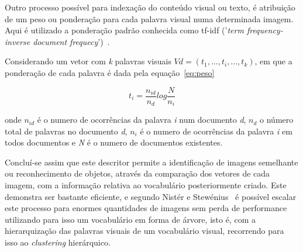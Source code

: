 Outro processo possível para indexação do conteúdo visual ou texto, é atribuição de um peso ou ponderação para cada palavra visual numa determinada imagem. Aqui é utilizado a ponderação padrão conhecida como tf-idf ('\textit{term frequency-inverse document frequecy}')~\cite{Sivic2003}. 

Considerando um vetor com \textit{k} palavras visuais $Vd = (t_{1},...,t_{i},...,t_{k})$, em que a ponderação de cada palavra é dada pela equação~\ref{eq:peso}

\begin{equation}
t_{i} = \frac{n_{id}}{n_{d}}log\frac{N}{n_{i}}
\label{eq:peso}
\end{equation}

onde $n_{id}$ é o numero de ocorrências da palavra \textit{i} num documento \textit{d}, $n_{d}$ o número total de palavras no documento \textit{d}, $n_{i}$ é o numero de ocorrências da palavra \textit{i} em todos documentos e \textit{N} é o numero de documentos existentes. 

Concluí-se assim que este descritor permite a identificação de imagens semelhante ou reconhecimento de objetos, através da comparação dos vetores de cada imagem, com a informação relativa ao vocabulário posteriormente criado. Este demonstra ser bastante eficiente, e segundo Nistér e Stewénius~\cite{Nister2006} é possível escalar este processo para enormes quantidades de imagens sem perda de performance utilizando para isso um vocabulário em forma de árvore, isto é, com a hierarquização das palavras visuais de um vocabulário visual, recorrendo para isso ao \textit{clustering} hierárquico.

%

